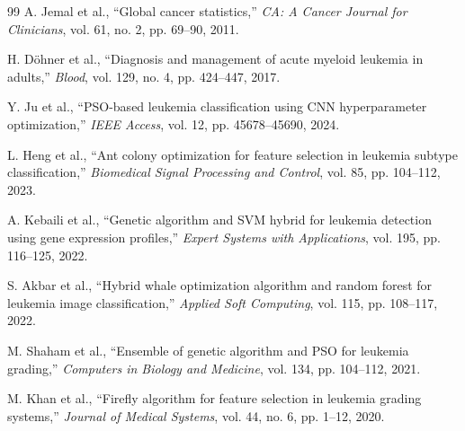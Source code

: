 \documentclass[11pt, a4paper]{article}
\begin{document}
\begin{thebibliography}{99}
A. Jemal et al., ``Global cancer statistics,'' \emph{CA: A Cancer Journal for Clinicians}, vol. 61, no. 2, pp. 69--90, 2011.

H. Döhner et al., ``Diagnosis and management of acute myeloid leukemia in adults,'' \emph{Blood}, vol. 129, no. 4, pp. 424--447, 2017.

Y. Ju et al., ``PSO-based leukemia classification using CNN hyperparameter optimization,'' \emph{IEEE Access}, vol. 12, pp. 45678--45690, 2024.

L. Heng et al., ``Ant colony optimization for feature selection in leukemia subtype classification,'' \emph{Biomedical Signal Processing and Control}, vol. 85, pp. 104--112, 2023.

A. Kebaili et al., ``Genetic algorithm and SVM hybrid for leukemia detection using gene expression profiles,'' \emph{Expert Systems with Applications}, vol. 195, pp. 116--125, 2022.

S. Akbar et al., ``Hybrid whale optimization algorithm and random forest for leukemia image classification,'' \emph{Applied Soft Computing}, vol. 115, pp. 108--117, 2022.

M. Shaham et al., ``Ensemble of genetic algorithm and PSO for leukemia grading,'' \emph{Computers in Biology and Medicine}, vol. 134, pp. 104--112, 2021.

M. Khan et al., ``Firefly algorithm for feature selection in leukemia grading systems,'' \emph{Journal of Medical Systems}, vol. 44, no. 6, pp. 1--12, 2020.

\end{thebibliography}

\appendix
\end{document}

